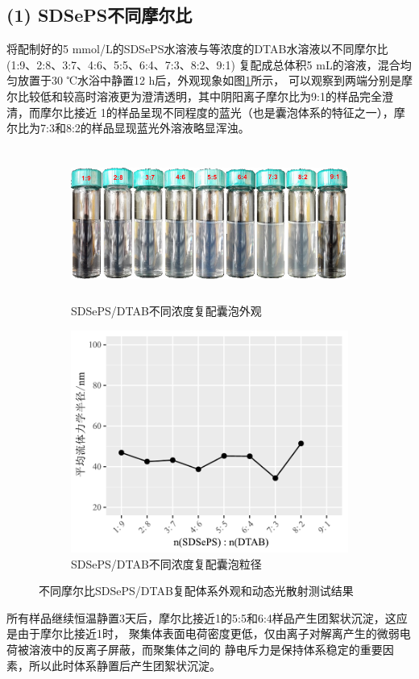 \documentclass[bachelor,winfonts,replaceperiod]{jnuthesis}
\begin{document}
    \subsection*{(1) SDSePS不同摩尔比}
    将配制好的5 mmol/L的SDSePS水溶液与等浓度的DTAB水溶液以不同摩尔比 (1:9、2:8、3:7、4:6、5:5、6:4、7:3、8:2、9:1)
    复配成总体积5 mL的溶液，混合均匀放置于30 ℃水浴中静置12 h后，外观现象如图\ref{fig:SDSePS-DTAB-ratio}所示，
    可以观察到两端分别是摩尔比较低和较高时溶液更为澄清透明，其中阴阳离子摩尔比为9:1的样品完全澄清，而摩尔比接近
    1的样品呈现不同程度的蓝光（也是囊泡体系的特征之一），摩尔比为7:3和8:2的样品显现蓝光外溶液略显浑浊。
    \begin{figure}[htbp]
        \centering
        \begin{subfigure}[]{\textwidth}
            \centering
            \includegraphics[height=5cm]{figure/SDSePS-DTAB-ratio.png}
            \caption{SDSePS/DTAB不同浓度复配囊泡外观}\label{fig:SDSePS-DTAB-ratio}
        \end{subfigure}%
        
        \begin{subfigure}[]{\textwidth}
            \centering
            \includegraphics[width=.6\textwidth]{figure/SDSePS-DTAB-ratio-fig.pdf}
            \caption{SDSePS/DTAB不同浓度复配囊泡粒径}\label{fig:SDSePS-DTAB-ratio-fig}
        \end{subfigure}%
        \caption{不同摩尔比SDSePS/DTAB复配体系外观和动态光散射测试结果}
        \label{fig:不同摩尔比SDSePS/DTAB}
    \end{figure}
    所有样品继续恒温静置3天后，摩尔比接近1的5:5和6:4样品产生团絮状沉淀，这应是由于摩尔比接近1时，
    聚集体表面电荷密度更低，仅由离子对解离产生的微弱电荷被溶液中的反离子屏蔽，而聚集体之间的
    静电斥力是保持体系稳定的重要因素，所以此时体系静置后产生团絮状沉淀。
    
\end{document}
